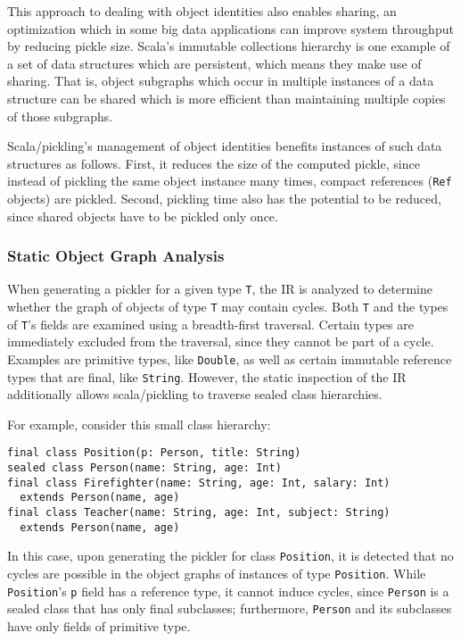 This approach to dealing with object identities also enables sharing, an
optimization which in some big data applications can improve system throughput
by reducing pickle size. Scala's immutable collections hierarchy is one
example of a set of data structures which are persistent, which means they
make use of sharing. That is, object subgraphs which occur in multiple
instances of a data structure can be shared which is more efficient than
maintaining multiple copies of those subgraphs.

Scala/pickling's management of object identities benefits instances of such
data structures as follows. First, it reduces the size of the computed pickle,
since instead of pickling the same object instance many times, compact
references (\verb|Ref| objects) are pickled. Second, pickling time also has
the potential to be reduced, since shared objects have to be pickled only
once.

\subsubsection{Static Object Graph Analysis}
\label{sec:object-graph-analysis}

When generating a pickler for a given type \verb|T|, the IR is analyzed to
determine whether the graph of objects of type \verb|T| may contain cycles.
Both \verb|T| and the types of \verb|T|'s fields are examined using a breadth-first
traversal. Certain types are immediately excluded from the traversal,
since they cannot be part of a cycle. Examples are primitive types, like
\verb|Double|, as well as certain immutable reference types that are final,
like \verb|String|. However, the static inspection of the IR additionally
allows scala/pickling to traverse sealed class hierarchies.

For example, consider this small class hierarchy:

\begin{lstlisting}
final class Position(p: Person, title: String)
sealed class Person(name: String, age: Int)
final class Firefighter(name: String, age: Int, salary: Int)
  extends Person(name, age)
final class Teacher(name: String, age: Int, subject: String)
  extends Person(name, age)
\end{lstlisting}

In this case, upon generating the pickler for class \verb|Position|, it is
detected that no cycles are possible in the object graphs of instances of type
\verb|Position|. While \verb|Position|'s \verb|p| field has a reference type,
it cannot induce cycles, since \verb|Person| is a sealed class that has only
final subclasses; furthermore, \verb|Person| and its subclasses have only
fields of primitive type.

